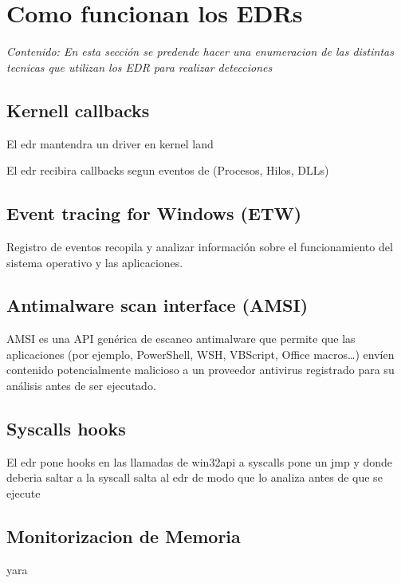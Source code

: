 \chapter{Como funcionan los EDRs}

\textit{Contenido: En esta sección se predende hacer una enumeracion de las 
distintas tecnicas que utilizan los EDR para realizar detecciones}
\vspace{1em}

\section{Kernell callbacks}

El edr mantendra un driver en kernel land

El edr recibira callbacks segun eventos de (Procesos, Hilos, DLLs)

\section{Event tracing for Windows (ETW)}

Registro de eventos recopila y analizar información sobre el funcionamiento 
del sistema operativo y las aplicaciones.

\section{Antimalware scan interface (AMSI)}

AMSI es una API genérica de escaneo antimalware que permite que las aplicaciones
(por ejemplo, PowerShell, WSH, VBScript, Office macros…) envíen contenido 
potencialmente malicioso a un proveedor antivirus registrado para su análisis 
antes de ser ejecutado.

\section{Syscalls hooks}

El edr pone hooks en las llamadas de win32api a syscalls
pone un jmp y donde deberia saltar a la syscall salta al edr de modo que lo 
analiza antes de que se ejecute

\section{Monitorizacion de Memoria}

yara
